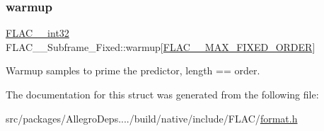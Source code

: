 \subsubsection{\texorpdfstring{warmup}{warmup}}
{\footnotesize\ttfamily \hyperlink{ordinals_8h_a33fd77bfe6d685541a0c034a75deccdc}{F\+L\+A\+C\+\_\+\+\_\+int32} F\+L\+A\+C\+\_\+\+\_\+\+Subframe\+\_\+\+Fixed\+::warmup\mbox{[}\hyperlink{group__flac__format_gabd0d5d6fe71b337244712b244ae7cb0f}{F\+L\+A\+C\+\_\+\+\_\+\+M\+A\+X\+\_\+\+F\+I\+X\+E\+D\+\_\+\+O\+R\+D\+ER}\mbox{]}}

Warmup samples to prime the predictor, length == order. 

The documentation for this struct was generated from the following file\+:\begin{DoxyCompactItemize}
\item 
src/packages/\+Allegro\+Deps..../build/native/include/\+F\+L\+A\+C/\hyperlink{format_8h}{format.\+h}\end{DoxyCompactItemize}

